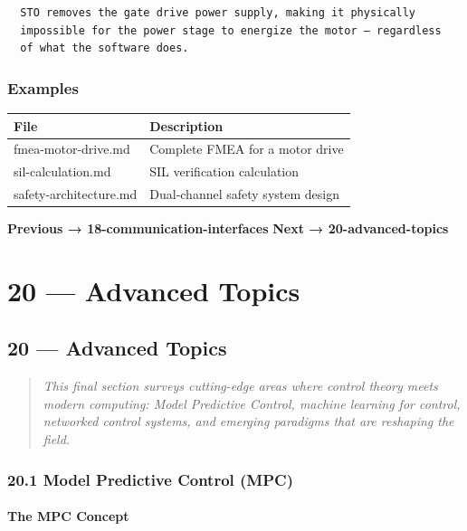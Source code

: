 \documentclass[11pt,a4paper]{book}
\begin{document}
\begin{itemize}
\begin{lstlisting}
  STO removes the gate drive power supply, making it physically
  impossible for the power stage to energize the motor — regardless
  of what the software does.
\end{lstlisting}

\medskip\noindent\hrulefill\medskip

\subsection{Examples}

\begin{center}
\begin{tabular}{|l|l|}
\hline
File & Description \\
\hline
fmea-motor-drive.md & Complete FMEA for a motor drive \\
sil-calculation.md & SIL verification calculation \\
safety-architecture.md & Dual-channel safety system design \\
\hline
\end{tabular}
\end{center}

\medskip\noindent\hrulefill\medskip

\textbf{Previous → 18-communication-interfaces}  
\textbf{Next → 20-advanced-topics}


\chapter{20 — Advanced Topics}
\section{20 — Advanced Topics}

\begin{quote}
\textit{This final section surveys cutting-edge areas where control theory meets modern computing: Model Predictive Control, machine learning for control, networked control systems, and emerging paradigms that are reshaping the field.}
\end{quote}

\medskip\noindent\hrulefill\medskip

\subsection{20.1 Model Predictive Control (MPC)}

\subsubsection{The MPC Concept}


\end{itemize}
\end{document}
